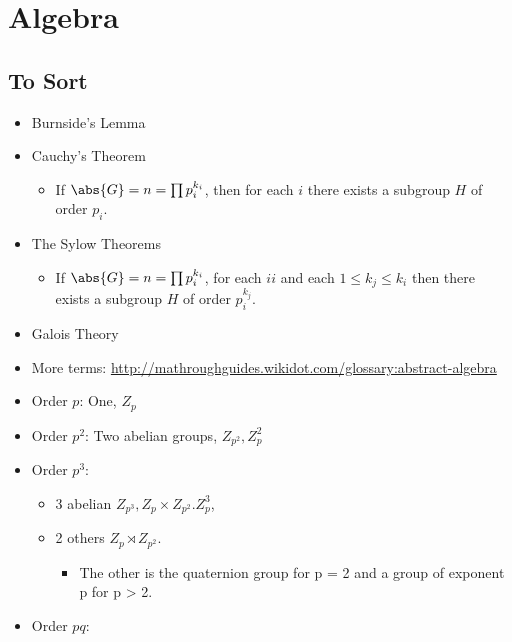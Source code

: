 
\hypertarget{algebra}{%
\section{Algebra}\label{algebra}}


\hypertarget{to-sort}{%
\subsection{To Sort}\label{to-sort}}

\begin{itemize}
\item
  Burnside's Lemma
\item
  Cauchy's Theorem

  \begin{itemize}
  \tightlist
  \item
    If \(\abs{G} = n = \prod p_i^{k_i}\), then for each \(i\) there
    exists a subgroup \(H\) of order \(p_i\).
  \end{itemize}
\item
  The Sylow Theorems

  \begin{itemize}
  \tightlist
  \item
    If \(\abs{G} = n = \prod p_i^{k_i}\), for each \(ii\) and each
    \(1 \leq k_j \leq k_i\) then there exists a subgroup \(H\) of order
    \(p_i^{k_j}\).
  \end{itemize}
\item
  Galois Theory
\item
  More terms:
  \url{http://mathroughguides.wikidot.com/glossary:abstract-algebra}
\item
  Order \(p\): One, \(Z_p\)
\item
  Order \(p^2\): Two abelian groups, \(Z_{p^2}, Z_p^2\)
\item
  Order \(p^3\):

  \begin{itemize}
  \item
    3 abelian \(Z_{p^3}, Z_p \times Z_{p^2}. Z_p^3\),
  \item
    2 others \(Z_p \rtimes Z_{p^2}\).

    \begin{itemize}
    \tightlist
    \item
      The other is the quaternion group for p = 2 and a group of
      exponent p for p \textgreater{} 2.
    \end{itemize}
  \end{itemize}
\item
  Order \(pq\):


\end{itemize}
